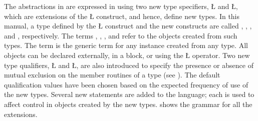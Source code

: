 \documentclass[openright,twoside]{report}
\begin{document}
The abstractions in  are expressed in \uC using two new type specifiers, \LGinlinetrue\LGbegin\lgrinde\L{}\endlgrinde\LGend{} and \LGinlinetrue\LGbegin\lgrinde\L{}\endlgrinde\LGend{}, which are extensions of the \LGinlinetrue\LGbegin\lgrinde\L{}\endlgrinde\LGend{} construct, and hence, define new types.
In this manual, a type defined by the \LGinlinetrue\LGbegin\lgrinde\L{}\endlgrinde\LGend{} construct and the new constructs are called , , ,  and , respectively.
The terms , , ,  and  refer to the objects created from such types.
The term  is the generic term for any instance created from any type.
All objects can be declared externally, in a block, or using the \LGinlinetrue\LGbegin\lgrinde\L{}\endlgrinde\LGend{} operator.
Two new type qualifiers, \LGinlinetrue\LGbegin\lgrinde\L{}\endlgrinde\LGend{} and \LGinlinetrue\LGbegin\lgrinde\L{}\endlgrinde\LGend{}, are also introduced to specify the presence or absence of mutual exclusion on the member routines of a type (see ).
The default qualification values have been chosen based on the expected frequency of use of the new types.
Several new statements are added to the language;
each is used to affect control in objects created by the new types.
 shows the grammar for all the \uC extensions.
\end{document}
